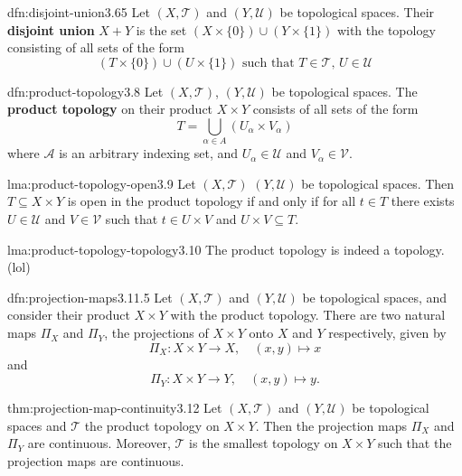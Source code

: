 \documentclass[landscape, 8pt]{extarticle}
\begin{document}
\begin{multicols}{3}
\begin{dfn}{dfn:disjoint-union}{3.65}
	Let $(X, \mathcal{T})$ and $(Y, \mathcal{U})$ be topological spaces. Their \textbf{disjoint union} $X + Y$ is the set $(X \times \{0\}) \cup (Y \times \{1\})$ with the topology consisting of all sets of the form
	\[(T \times \{0\}) \cup (U \times \{1\})\text{ such that }T \in \mathcal{T},\,U \in \mathcal{U}\]
\end{dfn}

\begin{dfn}{dfn:product-topology}{3.8}
	Let $(X, \mathcal{T})$, $(Y, \mathcal{U})$ be topological spaces. The \textbf{product topology} on their product $X \times Y$ consists of all sets of the form
	\[T = \bigcup_{\alpha\in A} (U_{\alpha} \times V_{\alpha})\]
	where $\mathcal{A}$ is an arbitrary indexing set, and $U_{\alpha}\in \mathcal{U}$ and $V_{\alpha}\in \mathcal{V}$.
\end{dfn}

\begin{lma}{lma:product-topology-open}{3.9}
	Let $(X, \mathcal{T})$ $(Y, \mathcal{U})$ be topological spaces. Then $T \subseteq X \times Y$ is open in the product topology if and only if for all $t\in T$ there exists $U \in \mathcal{U}$ and $V \in \mathcal{V}$ such that $t \in U \times V$ and $U \times V \subseteq T$.
\end{lma}

\begin{lma}{lma:product-topology-topology}{3.10}
	The product topology is indeed a topology. (lol)
\end{lma}

\begin{dfn}{dfn:projection-maps}{3.11.5}
	Let $(X, \mathcal{T})$ and $(Y, \mathcal{U})$ be topological spaces, and consider their product $X \times Y$ with the product topology. There are two natural maps $\Pi_{X}$ and $\Pi_{Y}$, the projections of $X \times Y$ onto $X$ and $Y$ respectively, given by
	\[\Pi_{X} : X \times Y \to X, \quad (x, y) \mapsto x\]
	and
	\[\Pi_{Y} : X \times Y \to Y, \quad (x, y) \mapsto y.\]
\end{dfn}

\begin{thm}{thm:projection-map-continuity}{3.12}
	Let $(X, \mathcal{T})$ and $(Y, \mathcal{U})$ be topological spaces and $\mathcal{T}$ the product topology on $X \times Y$. Then the projection maps $\Pi_{X}$ and $\Pi_{Y}$ are continuous. Moreover, $\mathcal{T}$ is the smallest topology on $X \times Y$ such that the projection maps are continuous.
\end{thm}


\end{multicols}
\end{document}

